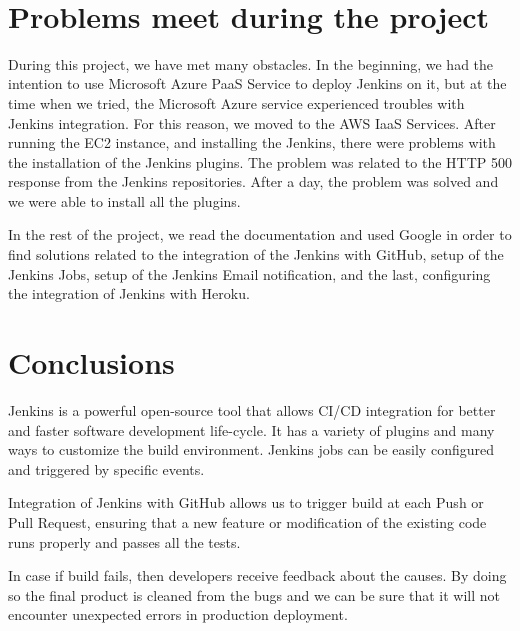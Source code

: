 \documentclass[12pt,a4paper,twoside]{article}
\begin{document}
~\newpage

\section{Problems meet during the project}


During this project, we have met many obstacles. In the beginning, we had the intention to use Microsoft Azure PaaS Service to deploy Jenkins on it, but at the time when we tried, the Microsoft Azure service experienced troubles with Jenkins integration. For this reason, we moved to the AWS IaaS Services. After running the EC2 instance, and installing the Jenkins, there were problems with the installation of the Jenkins plugins. The problem was related to the HTTP 500 response from the Jenkins repositories. After a day, the problem was solved and we were able to install all the plugins. 

In the rest of the project, we read the documentation and used Google in order to find solutions related to the integration of the Jenkins with GitHub, setup of the Jenkins Jobs, setup of the Jenkins Email notification, and the last, configuring the integration of Jenkins with Heroku.


\section{Conclusions}

Jenkins is a powerful open-source tool that allows CI/CD integration for better and faster software development life-cycle. It has a variety of plugins and many ways to customize the build environment. Jenkins jobs can be easily configured and triggered by specific events. 

Integration of Jenkins with GitHub allows us to trigger build at each Push or Pull Request, ensuring that a new feature or modification of the existing code runs properly and passes all the tests. 

In case if build fails, then developers receive feedback about the causes. By doing so the final product is cleaned from the bugs and we can be sure that it will not encounter unexpected errors in production deployment.




~\newpage
\end{document}
